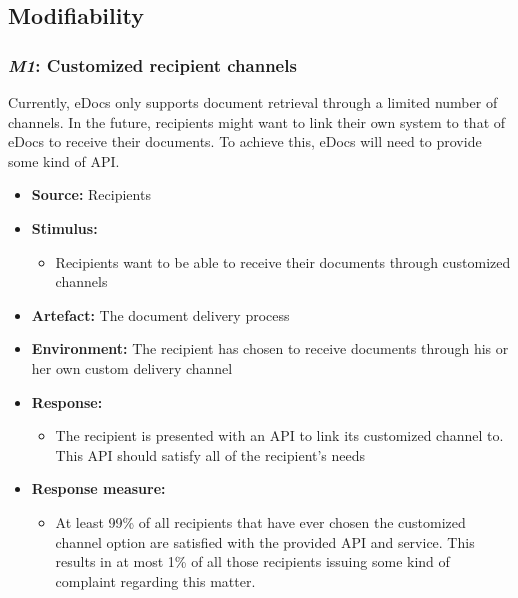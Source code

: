 \documentclass[a4paper,10pt]{article}
\begin{document}
\subsection{Modifiability}
\subsubsection{\emph{M1}: Customized recipient channels}
Currently, eDocs only supports document retrieval through a limited number of channels. In the future, recipients might want to link their own system to that of eDocs to receive their documents. To achieve this, eDocs will need to provide some kind of API.

\begin{itemize}
    \item \textbf{Source:} Recipients
    \item \textbf{Stimulus:}
        \begin{itemize}
            \item Recipients want to be able to receive their documents through customized channels
        \end{itemize}

    \item \textbf{Artefact:} The document delivery process
    \item \textbf{Environment:} The recipient has chosen to receive documents through his or her own custom delivery channel
    \item \textbf{Response:}
        \begin{itemize}
            \item The recipient is presented with an API to link its customized channel to. This API should satisfy all of the recipient's needs
        \end{itemize}

    \item \textbf{Response measure:}
        \begin{itemize}
            \item At least 99\% of all recipients that have ever chosen the customized channel option are satisfied with the provided API and service. This results in at most 1\% of all those recipients issuing some kind of complaint regarding this matter.
        \end{itemize}
\end{itemize}
\end{document}
